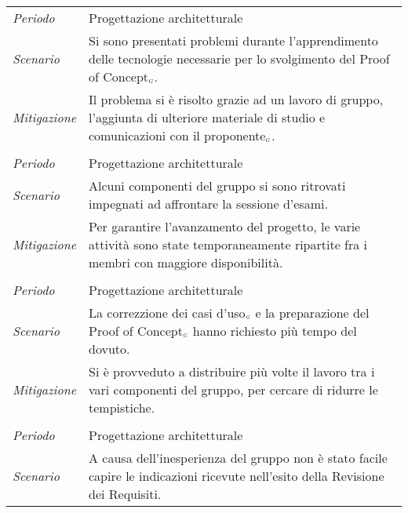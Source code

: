 {\def\tabularxcolumn#1{m{#1}}
{
	
	\begin{center}
		\renewcommand{\arraystretch}{1.4}
		\begin{longtable}{|p{5cm}|p{12cm}|}
			\hline
		\rowcolor{airforceblue}
		\multicolumn{2}{|c|}{\textit{RT1- Inesperienza tecnologica}}\\
		\hline
		\textit{Periodo} & Progettazione architetturale \\
		\hline
		\textit{Scenario} & Si sono presentati problemi durante l'apprendimento delle tecnologie necessarie per lo svolgimento del Proof of Concept$_{\scaleto{G}{3pt}}$. \\
		\hline
		\textit{Mitigazione} & Il problema si è risolto grazie ad un lavoro di gruppo, l'aggiunta di ulteriore materiale di studio e comunicazioni con il proponente$_{\scaleto{G}{3pt}}$. \\
		\hline
		\rowcolor{airforceblue}
		\multicolumn{2}{|c|}{\textit{RO2- Impegni personali}}\\
		\hline
		\textit{Periodo} & Progettazione architetturale \\
		\hline
		\textit{Scenario} & Alcuni componenti del gruppo si sono ritrovati impegnati ad affrontare la sessione d'esami. \\
		\hline
		\textit{Mitigazione} & Per garantire l'avanzamento del progetto, le varie attività sono state temporaneamente ripartite fra i membri con maggiore disponibilità. \\
			\hline
		\rowcolor{airforceblue}
		\multicolumn{2}{|c|}{\textit{RO3- Calcolo dei tempi e dei costi}}\\
		\hline
		\textit{Periodo} & Progettazione architetturale \\
		\hline
		\textit{Scenario} & La correzzione dei casi d'uso$_{\scaleto{G}{3pt}}$ e la preparazione del Proof of Concept$_{\scaleto{G}{3pt}}$ hanno richiesto più tempo del dovuto. \\
		\hline
		\textit{Mitigazione} & Si è provveduto a distribuire più volte il lavoro tra i vari componenti del gruppo, per cercare di ridurre le tempistiche. \\
			\hline
			\rowcolor{airforceblue}
			\multicolumn{2}{|c|}{\textit{RO4- Inesperienza nel coordinamento}}\\
			\hline
			\textit{Periodo} & Progettazione architetturale \\
			\hline
			\textit{Scenario} & A causa dell'inesperienza del gruppo non è stato facile capire le indicazioni ricevute nell'esito della Revisione dei Requisiti. \\

\end{longtable}
\end{center}}}
